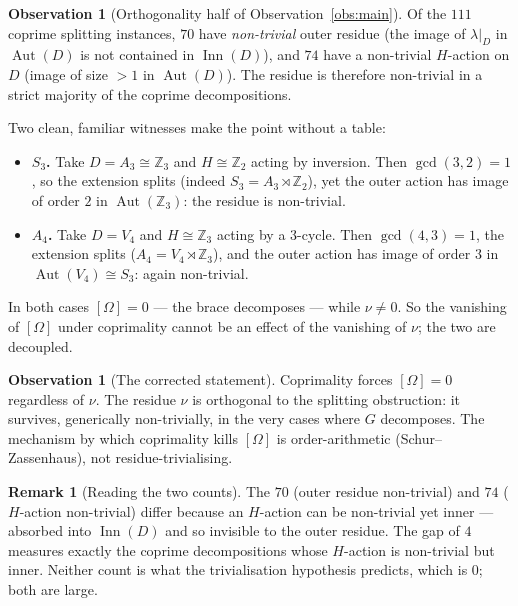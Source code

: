 \documentclass[11pt]{article}
\theoremstyle{definition}
\newtheorem{remark}[theorem]{Remark}
\newtheorem{observation}[theorem]{Observation}
\newcommand{\Z}{\mathbb{Z}}
\newcommand{\Aut}{\operatorname{Aut}}
\newcommand{\Inn}{\operatorname{Inn}}
\newcommand{\gcdd}{\gcd}
\begin{document}
\begin{observation}[Orthogonality half of Observation~\ref{obs:main}]\label{obs:residue}
Of the $111$ coprime splitting instances, $70$ have \emph{non-trivial} outer residue (the
image of $\lambda|_D$ in $\Aut(D)$ is not contained in $\Inn(D)$), and $74$ have a
non-trivial $H$-action on $D$ (image of size $>1$ in $\Aut(D)$). The residue is therefore
non-trivial in a strict majority of the coprime decompositions.
\end{observation}

Two clean, familiar witnesses make the point without a table:

\begin{itemize}
\item[$\bullet$] \textbf{$S_3$.} Take $D=A_3\cong\Z_3$ and $H\cong\Z_2$ acting by inversion.
Then $\gcdd(3,2)=1$, so the extension splits (indeed $S_3=A_3\rtimes\Z_2$), yet the outer
action has image of order $2$ in $\Aut(\Z_3)$: the residue is non-trivial.
\item[$\bullet$] \textbf{$A_4$.} Take $D=V_4$ and $H\cong\Z_3$ acting by a $3$-cycle. Then
$\gcdd(4,3)=1$, the extension splits ($A_4=V_4\rtimes\Z_3$), and the outer action has image of
order $3$ in $\Aut(V_4)\cong S_3$: again non-trivial.
\end{itemize}

In both cases $[\Omega]=0$ --- the brace decomposes --- while $\nu\ne0$. So the vanishing of
$[\Omega]$ under coprimality cannot be an effect of the vanishing of $\nu$; the two are
decoupled.

\begin{observation}[The corrected statement]\label{obs:orth}
Coprimality forces $[\Omega]=0$ regardless of $\nu$. The residue $\nu$ is orthogonal to the
splitting obstruction: it survives, generically non-trivially, in the very cases where $G$
decomposes. The mechanism by which coprimality kills $[\Omega]$ is order-arithmetic
(Schur--Zassenhaus), not residue-trivialising.
\end{observation}

\begin{remark}[Reading the two counts]
The $70$ (outer residue non-trivial) and $74$ ($H$-action non-trivial) differ because an
$H$-action can be non-trivial yet inner --- absorbed into $\Inn(D)$ and so invisible to the
outer residue. The gap of $4$ measures exactly the coprime decompositions whose $H$-action is
non-trivial but inner. Neither count is what the trivialisation hypothesis predicts, which is
$0$; both are large.
\end{remark}
\end{document}
